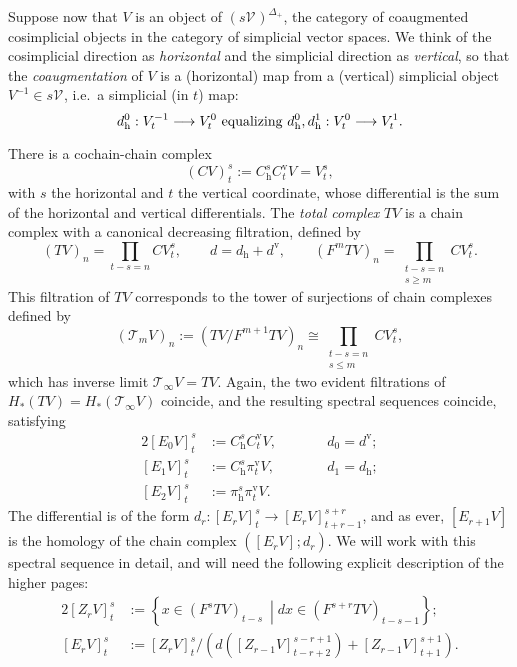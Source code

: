 \documentclass[11pt]{amsart} \renewcommand{\baselinestretch}{1.2}
\theoremstyle{plain}
\numberwithin{equation}{section} %
\theoremstyle{plain}
\numberwithin{equation}{chapter} %
\renewcommand{\to}{\longrightarrow}
\newcommand{\calT}{\mathcal{T}}
\newcommand{\calV}{\mathcal{V}}
\newcommand{\vect}[2]{\calV^{#1}_{#2}}
\newcommand{\E}[5]{[E^{#1}_{#2}#3]^{#4}_{#5}}
\newcommand{\Edownup}[5]{[E_{#1}^{#2}#3]^{#4}_{#5}}
\newcommand{\EZ}[5]{[Z^{#1}_{#2}#3]^{#4}_{#5}}
\newcommand{\uver}{^\mathrm{v}}
\newcommand{\dhor}{_\mathrm{h}}
\begin{document}
\begin{Conventions and notation}
Suppose now that $V$ is an object of $(s\vect{}{})^{\Delta_+}$, the category of coaugmented cosimplicial objects in the category of simplicial vector spaces. We think of the cosimplicial direction as \emph{horizontal} and the simplicial direction as \emph{vertical}, so that the \emph{coaugmentation} of $V$ is a (horizontal) map from a (vertical) simplicial object $V^{-1}\in s\vect{}{}$, i.e.\ a simplicial (in $t$) map:
\[d\dhor^0:V_{t}^{-1}\to V^{0}_{t}\textup{ equalizing }d\dhor^0,d\dhor^1:V^{0}_{t}\to V^{1}_{t}.\]

There is a cochain-chain complex 
\[(CV)^{s}_{t}:=C\dhor^{s}C\uver_{t}V=V^{s}_{t},\]
with $s$ the horizontal and $t$ the vertical coordinate, whose differential is the sum of the horizontal and vertical differentials. The \emph{total complex} $TV$ is a chain complex with a canonical decreasing filtration, defined by 
\[\textstyle(TV)_n=\prod_{t-s=n}CV^{s}_{t},\qquad d=d\dhor+d\uver,\qquad(F^mTV)_n=\prod_{\substack{t-s=n\\s\geq m}}CV^{s}_{t}.\]
This filtration of $TV$ corresponds to the tower of surjections of chain complexes defined by
\[(\calT_mV)_n:=(TV/F^{m+1} TV)_n\cong\textstyle\prod_{\substack{t-s=n\\s\leq m}}CV^{s}_{t}, \]
which has inverse limit $\calT_\infty V=TV$. Again, the two evident filtrations of $H_*(TV)=H_*(\calT_\infty V)$ coincide, and the resulting spectral sequences coincide, satisfying
\begin{alignat*}{2}
\Edownup{0}{}{V}{s}{t}
&:=
C\dhor^sC\uver_tV,
&\qquad&d_0=d\uver;\\
\Edownup{1}{}{V}{s}{t}
&:=
C\dhor^s\pi\uver_tV,
&\qquad&d_1=d\dhor;\\
\Edownup{2}{}{V}{s}{t}
&:=
\pi\dhor^s\pi\uver_tV.
\end{alignat*}
The differential is of the form $d_r:\Edownup{r}{}{V}{s}{t}\to \Edownup{r}{}{V}{s+r}{t+r-1}$, and as ever, $\Edownup{r+1}{}{V}{}{}$ is the homology of the chain complex $(\Edownup{r}{}{V}{}{};d_r)$. We will work with this spectral sequence in detail, and will need the following explicit description of the higher pages:
\begin{alignat*}{2}
\EZ{}{r}{V}{s}{t}&:=\left\{x\in (F^sTV)_{t-s}\ \middle| dx\in (F^{s+r}TV)_{t-s-1}\right\};\\
\E{}{r}{V}{s}{t}&:=\EZ{}{r}{V}{s}{t}/\left(d\left(\EZ{}{r-1}{V}{s-r+1}{t-r+2}\right)+\EZ{}{r-1}{V}{s+1}{t+1}\right).
\end{alignat*}



\end{Conventions and notation}
\end{document}
